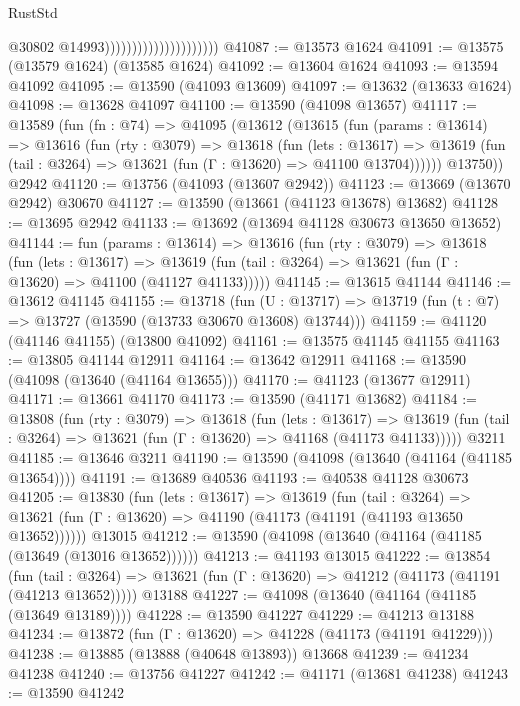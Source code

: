 \begin{lexlean}{RustStd}
\begin{coremodule}
                                              @30802
                                              @14993)))))))))))))))))))))
@41087 := @13573 @1624
@41091 := @13575 (@13579 @1624) (@13585 @1624)
@41092 := @13604 @1624
@41093 := @13594 @41092
@41095 := @13590 (@41093 @13609)
@41097 := @13632 (@13633 @1624)
@41098 := @13628 @41097
@41100 := @13590 (@41098 @13657)
@41117 := @13589
    (fun (fn : @74) =>
    @41095
      (@13612
        (@13615
          (fun (params : @13614) =>
          @13616
            (fun (rty : @3079) =>
            @13618
              (fun (lets : @13617) =>
              @13619 (fun (tail : @3264) => @13621 (fun (Γ : @13620) => @41100 @13704))))))
        @13750))
    @2942
@41120 := @13756 (@41093 (@13607 @2942))
@41123 := @13669 (@13670 @2942) @30670
@41127 := @13590 (@13661 (@41123 @13678) @13682)
@41128 := @13695 @2942
@41133 := @13692 (@13694 @41128 @30673 @13650 @13652)
@41144 := fun (params : @13614) =>
  @13616
    (fun (rty : @3079) =>
    @13618
      (fun (lets : @13617) =>
      @13619 (fun (tail : @3264) => @13621 (fun (Γ : @13620) => @41100 (@41127 @41133)))))
@41145 := @13615 @41144
@41146 := @13612 @41145
@41155 := @13718
    (fun (U : @13717) => @13719 (fun (t : @7) => @13727 (@13590 (@13733 @30670 @13608) @13744)))
@41159 := @41120 (@41146 @41155) (@13800 @41092)
@41161 := @13575 @41145 @41155
@41163 := @13805 @41144 @12911
@41164 := @13642 @12911
@41168 := @13590 (@41098 (@13640 (@41164 @13655)))
@41170 := @41123 (@13677 @12911)
@41171 := @13661 @41170
@41173 := @13590 (@41171 @13682)
@41184 := @13808
    (fun (rty : @3079) =>
    @13618
      (fun (lets : @13617) =>
      @13619 (fun (tail : @3264) => @13621 (fun (Γ : @13620) => @41168 (@41173 @41133)))))
    @3211
@41185 := @13646 @3211
@41190 := @13590 (@41098 (@13640 (@41164 (@41185 @13654))))
@41191 := @13689 @40536
@41193 := @40538 @41128 @30673
@41205 := @13830
    (fun (lets : @13617) =>
    @13619
      (fun (tail : @3264) =>
      @13621 (fun (Γ : @13620) => @41190 (@41173 (@41191 (@41193 @13650 @13652))))))
    @13015
@41212 := @13590 (@41098 (@13640 (@41164 (@41185 (@13649 (@13016 @13652))))))
@41213 := @41193 @13015
@41222 := @13854
    (fun (tail : @3264) => @13621 (fun (Γ : @13620) => @41212 (@41173 (@41191 (@41213 @13652)))))
    @13188
@41227 := @41098 (@13640 (@41164 (@41185 (@13649 @13189))))
@41228 := @13590 @41227
@41229 := @41213 @13188
@41234 := @13872 (fun (Γ : @13620) => @41228 (@41173 (@41191 @41229)))
@41238 := @13885 (@13888 (@40648 @13893)) @13668
@41239 := @41234 @41238
@41240 := @13756 @41227
@41242 := @41171 (@13681 @41238)
@41243 := @13590 @41242

\end{coremodule}
\end{lexlean}
